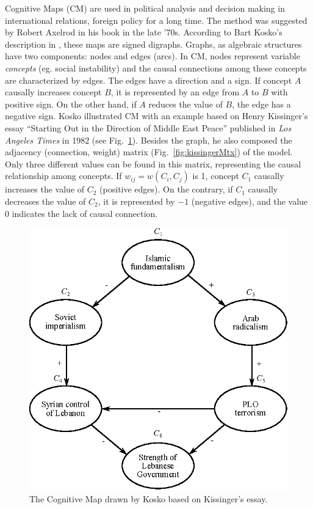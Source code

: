 \documentclass[graybox]{svmult}
\begin{document}
Cognitive Maps (CM) are used in political analysis and decision making in international relations, foreign policy for a long time. The method was suggested by Robert Axelrod in his book \cite{axelrod} in the late '70s. According to Bart Kosko's description in \cite{b.kosko1986}, these maps are signed digraphs. Graphs, as algebraic structures have two components: nodes and edges (arcs). In CM, nodes represent variable \emph{concepts} (eg. social instability) and the causal connections among these concepts are characterized by edges. The edges have a direction and a sign. If concept $A$ causally increases concept $B$, it is represented by an edge from $A$ to $B$ with positive sign. On the other hand, if $A$ reduces the value of $B$, the edge has a negative sign. Kosko illustrated CM with an example based on Henry Kissinger's essay ``Starting Out in the Direction of Middle East Peace'' published in \emph{Los Angeles Times} in 1982 (see Fig.~\ref{fig:kissingerCM}). Besides the graph, he also composed the adjacency (connection, weight) matrix (Fig.~\ref{fig:kissingerMtx}) of the model. Only three different values can be found in this matrix, representing the causal relationship among concepts. If $w_{ij} = w(C_i, C_j)$ is 1, concept $C_1$ causally increases the value of $C_2$ (positive edges). On the contrary, if $C_1$ causally decreases the value of $C_2$, it is represented by $-1$ (negative edges), and the value 0 indicates the lack of causal connection.

\begin{figure}[hbt]
  \begin{center}
    \includegraphics[scale=1]{kissinger}
    \caption{The Cognitive Map drawn by Kosko based on Kissinger's essay.}
  \end{center}
  \label{fig:kissingerCM}
\end{figure}
\end{document}
